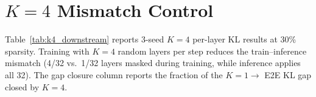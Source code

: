 \begin{table}[h]
\centering
\caption{2D decomposition at 30\% sparsity (LLaMA-3.1-8B, uniform allocation). All rows are 3-seed mean$\pm$std. Signal type = per-layer KL $-$ MSE; coupling = E2E KL $-$ per-layer KL. Percentages are upper bounds (dimensions not fully orthogonal; see \S\ref{sec:perlayer}).}
\label{tab:perlayer_downstream}
\end{table}

\section{$K{=}4$ Mismatch Control}
\label{app:k4_downstream}

Table~\ref{tab:k4_downstream} reports 3-seed $K{=}4$ per-layer KL results at 30\% sparsity.
Training with $K{=}4$ random layers per step reduces the train--inference mismatch (4/32 vs.\ 1/32 layers masked during training, while inference applies all 32).
The gap closure column reports the fraction of the $K{=}1 \to$ E2E KL gap closed by $K{=}4$.

